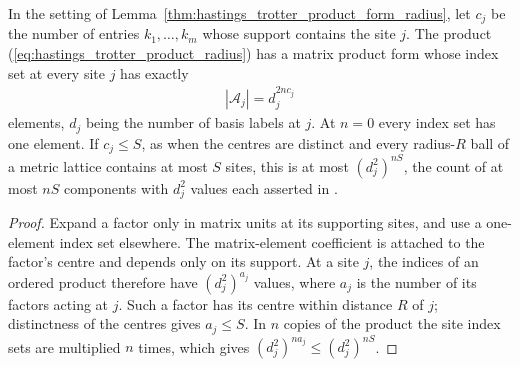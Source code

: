 \begin{lemma}
    \label{thm:hastings_trotter_index_count}
    \leanok
    In the setting of Lemma~\ref{thm:hastings_trotter_product_form_radius}, let $c_j$ be the
    number of entries $k_1,\dots,k_m$ whose support contains the site $j$. The product
    (\ref{eq:hastings_trotter_product_radius}) has a matrix product form whose index set at
    every site $j$ has exactly
    \begin{align}
        |\mathcal A_j|=d_j^{2nc_j}
        \label{eq:hastings_trotter_index_count}
    \end{align}
    elements, $d_j$ being the number of basis labels at $j$. At $n=0$ every index set has one
    element. If $c_j\le S$, as when the centres are distinct and every radius-$R$ ball of a
    metric lattice contains at most $S$ sites, this is at most $(d_j^2)^{nS}$, the count of at
    most $nS$ components with $d_j^2$ values each asserted in
    \cite[lines 1068--1075]{Hastings2006Solving}.
\end{lemma}
\begin{proof}\leanok
    Expand a factor only in matrix units at its supporting sites, and use a
    one-element index set elsewhere. The matrix-element coefficient is
    attached to the factor's centre and depends only on its support.
    At a site $j$, the indices of an ordered product therefore have
    $(d_j^2)^{a_j}$ values, where $a_j$ is the number of its factors acting
    at $j$. Such a factor has its centre within distance $R$ of $j$;
    distinctness of the centres gives $a_j\le S$.
    In $n$ copies of the product the site index sets are multiplied $n$
    times, which gives $(d_j^2)^{na_j}\le(d_j^2)^{nS}$.
\end{proof}

